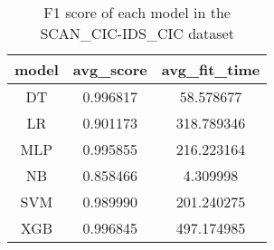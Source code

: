 \begin{table}[H]
\centering
\caption{F1 score of each model in the SCAN_CIC-IDS_CIC dataset}
\label{f1_valid_scan_cic-ids_cic}
\begin{tabular}{ccc}
\toprule
model &  avg\_score &  avg\_fit\_time \\
\midrule
   DT &   0.996817 &     58.578677 \\
   LR &   0.901173 &    318.789346 \\
  MLP &   0.995855 &    216.223164 \\
   NB &   0.858466 &      4.309998 \\
  SVM &   0.989990 &    201.240275 \\
  XGB &   0.996845 &    497.174985 \\
\bottomrule
\end{tabular}
\end{table}
